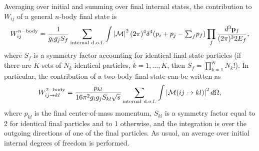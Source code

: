 Averaging over initial and summing over final internal states, the
contribution to $W_{ij}$ of a general $n$-body final state is
\begin{equation}
  W^{n\rm{-body}}_{ij} = 
  \frac{1}{g_i g_j S_f} \sum_{\rm{internal~d.o.f.}} 
  \int  \left| {\cal M} \right|^2 (2\pi)^4 
\delta^4(p_i+p_j-{\textstyle \sum_f}p_f) \prod_f
   \frac{d^3{\bf p}_f}{(2\pi)^3 2E_f} , 
\end{equation}
where $S_f$ is a symmetry factor accounting for identical final state
particles (if there are $K$ sets of $N_k$ identical particles,
$k=1,\dots,K$, then $S_f = \prod_{k=1}^{K} N_k!$).  In particular, 
the contribution
of a two-body final state can be written as
\begin{equation}
  W^{\rm{2-body}}_{ij\to kl} = \frac{p_{kl}}{16\pi^2 g_i g_j S_{kl} \sqrt{s}}
  \sum_{\rm{internal~d.o.f.}} \int \left| {\cal M}(ij\to kl) \right|^2
  d\Omega ,
\end{equation}
where $p_{kl}$ is the final center-of-mass momentum, $S_{kl}$ is a
symmetry factor equal to 2 for identical final particles and to 1
otherwise, and the integration is over the outgoing directions of
one of the final particles.  As usual, an average over initial
internal degrees of freedom is performed.

